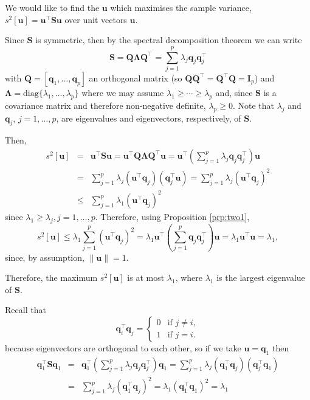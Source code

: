 \documentclass[]{book}
\theoremstyle{definition}
\theoremstyle{definition}
\theoremstyle{definition}
\theoremstyle{remark}
\begin{document}
We would like to find the \(\boldsymbol u\) which maximises the sample variance, \(s^2[\boldsymbol u] = \boldsymbol u^\top \boldsymbol S\boldsymbol u\) over unit vectors \(\boldsymbol u\).

Since \(\boldsymbol S\) is symmetric, then by the spectral decomposition theorem we can write
\[\boldsymbol S= \boldsymbol Q\boldsymbol \Lambda\boldsymbol Q^\top = \sum_{j=1}^p \lambda_j \boldsymbol q_j \boldsymbol q_j^\top \]
with \(\boldsymbol Q= [ \boldsymbol q_1, \ldots , \boldsymbol q_p ]\) an orthogonal matrix (so \(\boldsymbol Q\boldsymbol Q^\top = \boldsymbol Q^\top \boldsymbol Q= \boldsymbol I_p\)) and \(\boldsymbol \Lambda= \text{diag}\{ \lambda_1, \ldots, \lambda_p \}\) where we may assume \(\lambda_1 \geq \cdots \geq \lambda_p\) and, since \(\boldsymbol S\) is a covariance matrix and therefore non-negative definite, \(\lambda_p \geq 0\). Note that \(\lambda_j\) and \(\boldsymbol q_j\), \(j=1,\ldots,p\), are eigenvalues and eigenvectors, respectively, of \(\boldsymbol S\).

Then,
\begin{eqnarray*}
s^2[\boldsymbol u] &=& \boldsymbol u^\top \boldsymbol S\boldsymbol u= \boldsymbol u^\top \boldsymbol Q\boldsymbol \Lambda\boldsymbol Q^\top \boldsymbol u
= \boldsymbol u^\top \left(\sum_{j=1}^p \lambda_j \boldsymbol q_j \boldsymbol q_j^\top \right)\boldsymbol u\\
&=& \sum_{j=1}^p \lambda_j (\boldsymbol u^\top \boldsymbol q_j) (\boldsymbol q_j^\top \boldsymbol u)
= \sum_{j=1}^p \lambda_j (\boldsymbol u^\top \boldsymbol q_j)^2 \\
&\leq& \sum_{j=1}^p \lambda_1 (\boldsymbol u^\top \boldsymbol q_j)^2
\end{eqnarray*}
since \(\lambda_1 \geq \lambda_j, j=1,\ldots,p\). Therefore, using Proposition \ref{prp:two1},
\[ s^2[\boldsymbol u] \leq \lambda_1 \sum_{j=1}^p (\boldsymbol u^\top \boldsymbol q_j)^2
= \lambda_1 \boldsymbol u^\top \left ( \sum_{j=1}^p \boldsymbol q_j \boldsymbol q_j^\top  \right) \boldsymbol u
= \lambda_1 \boldsymbol u^\top \boldsymbol u=\lambda_1,\]
since, by assumption, \(\| \boldsymbol u\| = 1\).

Therefore, the maximum \(s^2[\boldsymbol u]\) is at most \(\lambda_1\), where \(\lambda_1\) is the largest eigenvalue of \(\boldsymbol S\).

Recall that
\[ \boldsymbol q_i^\top \boldsymbol q_j = \left\{ \begin{array}{ll} 0 & \text{if } j \neq i,\\ 1 & \text{if } j=i. \end{array} \right.\]
because eigenvectors are orthogonal to each other, so if we take \(\boldsymbol u= \boldsymbol q_1\) then
\begin{eqnarray*}
\boldsymbol q_1^\top \boldsymbol S\boldsymbol q_1 &=& \boldsymbol q_1^\top \left(\sum_{j=1}^p \lambda_j \boldsymbol q_j \boldsymbol q_j^\top \right)\boldsymbol q_1
= \sum_{j=1}^p \lambda_j (\boldsymbol q_1^\top \boldsymbol q_j) (\boldsymbol q_j^\top \boldsymbol q_1) \\
&=& \sum_{j=1}^p \lambda_j (\boldsymbol q_1^\top \boldsymbol q_j)^2
= \lambda_1 (\boldsymbol q_1^\top \boldsymbol q_1)^2
= \lambda_1
\end{eqnarray*}
\end{document}
